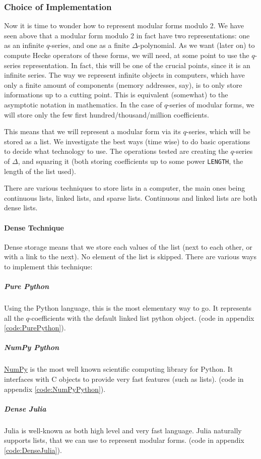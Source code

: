 \subsubsection{Choice of Implementation}
Now it is time to wonder how to represent modular forms modulo 2.
We have seen above that a modular form modulo 2 in fact have two representations: one as an infinite $q$-series, and one as a finite $\Delta$-polynomial.
As we want (later on) to compute Hecke operators of these forms, we will need, at some point to use the $q$-series representation.
In fact, this will be one of the crucial points, since it is an infinite series.
The way we represent infinite objects in computers, which have only a finite amount of components (memory addresses, say), is to only store informations up to a cutting point.
This is equivalent (somewhat) to the asymptotic notation in mathematics.
In the case of $q$-series of modular forms, we will store only the few first hundred/thousand/million coefficients.

This means that we will represent a modular form via its $q$-series, which will be stored as a list.
We investigate the best ways (time wise) to do basic operations to decide what technology to use.
The operations tested are creating the $q$-series of $\Delta$, and squaring it (both storing coefficients up to some power \texttt{LENGTH}, the length of the list used).

There are various techniques to store lists in a computer, the main ones being continuous lists, linked lists, and sparse lists.
Continuous and linked lists are both dense lists.

\paragraph{Dense Technique}
Dense storage means that we store each values of the list (next to each other, or with a link to the next).
No element of the list is skipped.
There are various ways to implement this technique:
\subparagraph{Pure Python}
Using the Python language, this is the most elementary way to go.
It represents all the $q$-coefficients with the default linked list python object.
(code in appendix \ref{code:PurePython}).
\subparagraph{NumPy Python}
\href{https://fr.wikipedia.org/wiki/NumPy}{NumPy} is the most well known scientific computing library for Python.
It interfaces with C objects to provide very fast features (such as lists).
(code in appendix \ref{code:NumPyPython}).
\subparagraph{Dense Julia}
Julia is well-known as both high level and very fast language.
Julia naturally supports lists, that we can use to represent modular forms.
(code in appendix \ref{code:DenseJulia}).

